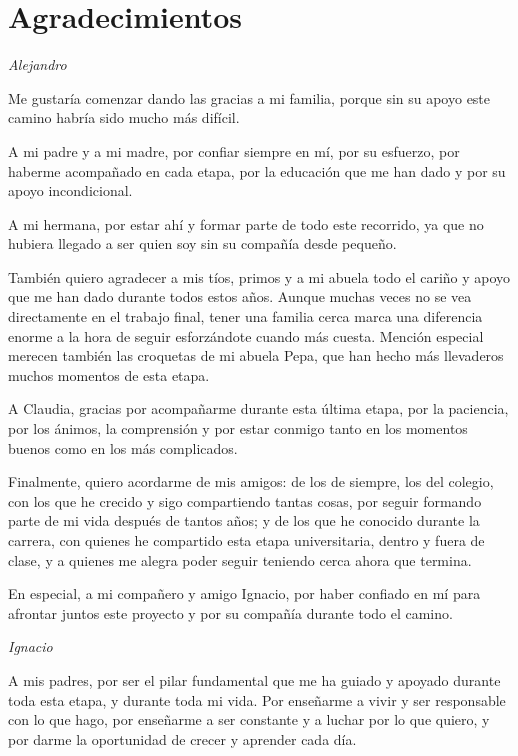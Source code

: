 \chapter*{Agradecimientos}

\begin{flushright}
\textit{Alejandro}
\end{flushright}

Me gustaría comenzar dando las gracias a mi familia, porque sin su apoyo este camino habría sido mucho más difícil.

A mi padre y a mi madre, por confiar siempre en mí, por su esfuerzo, por haberme acompañado en cada etapa, por la educación que me han dado y por su apoyo incondicional.

A mi hermana, por estar ahí y formar parte de todo este recorrido, ya que no hubiera llegado a ser quien soy sin su compañía desde pequeño.

También quiero agradecer a mis tíos, primos y a mi abuela todo el cariño y apoyo que me han dado durante todos estos años. Aunque muchas veces no se vea directamente en el trabajo final, tener una familia cerca marca una diferencia enorme a la hora de seguir esforzándote cuando más cuesta. Mención especial merecen también las croquetas de mi abuela Pepa, que han hecho más llevaderos muchos momentos de esta etapa.

A Claudia, gracias por acompañarme durante esta última etapa, por la paciencia, por los ánimos, la comprensión y por estar conmigo tanto en los momentos buenos como en los más complicados.

Finalmente, quiero acordarme de mis amigos: de los de siempre, los del colegio, con los que he crecido y sigo compartiendo tantas cosas, por seguir formando parte de mi vida después de tantos años; y de los que he conocido durante la carrera, con quienes he compartido esta etapa universitaria, dentro y fuera de clase, y a quienes me alegra poder seguir teniendo cerca ahora que termina.

En especial, a mi compañero y amigo Ignacio, por haber confiado en mí para afrontar juntos este proyecto y por su compañía durante todo el camino.
\clearpage

\begin{flushright}
\textit{Ignacio}
\end{flushright}

A mis padres, por ser el pilar fundamental que me ha guiado y apoyado durante toda 
esta etapa, y durante toda mi vida. Por enseñarme a vivir y ser responsable con lo que hago, por 
enseñarme a ser constante y a luchar por lo que quiero, y por darme la oportunidad de crecer y aprender cada día. 


